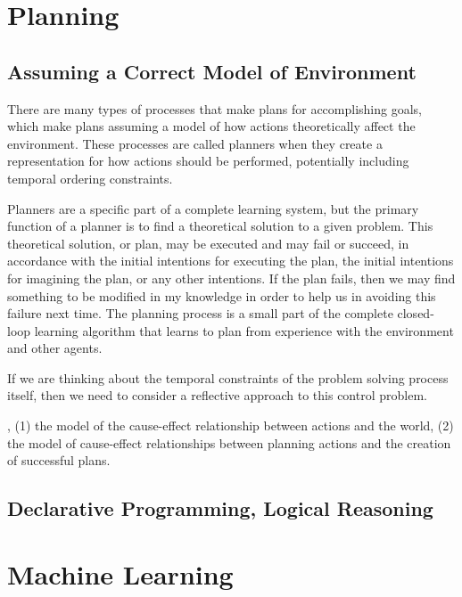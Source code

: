 \citep[p.~78]{minsky:1988}



\section{Planning}

\subsection{Assuming a Correct Model of Environment}

There are many types of processes that make plans for accomplishing
goals, which make plans assuming a model of how actions theoretically
affect the environment.  These processes are called planners when they
create a representation for how actions should be performed,
potentially including temporal ordering constraints.

Planners are a specific part of a complete learning system, but the
primary function of a planner is to find a theoretical solution to a
given problem.  This theoretical solution, or plan, may be executed
and may fail or succeed, in accordance with the initial intentions for
executing the plan, the initial intentions for imagining the plan, or
any other intentions.  If the plan fails, then we may find something
to be modified in my knowledge in order to help us in avoiding this
failure next time.  The planning process is a small part of the
complete closed-loop learning algorithm that learns to plan from
experience with the environment and other agents.



If we are thinking about the temporal constraints of the problem
solving process itself, then we need to consider a reflective approach
to this control problem.

  , (1) the model of the cause-effect relationship
between actions and the world, (2) the model of cause-effect
relationships between planning actions and the creation of successful
plans.

\subsection{Declarative Programming, Logical Reasoning}


\section{Machine Learning}

